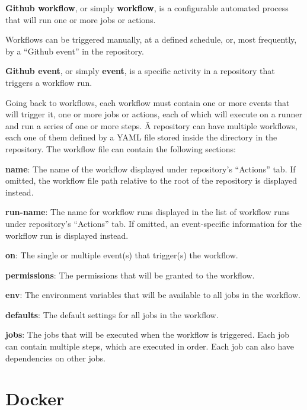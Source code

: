 \textbf{Github workflow}, or simply \textbf{workflow}, is a configurable automated process that will run one or more
jobs or actions.
\ed

Workflows can be triggered manually, at a defined schedule, or, most frequently, by a ``Github event'' in the
repository.

\textbf{Github event}, or simply \textbf{event}, is a specific activity in a repository that triggers a workflow run.
\ed

Going back to workflows, each workflow must contain one or more events that will trigger it, one or more jobs or
actions, each of which will execute on a runner and run a series of one or more steps. \v

A repository can have multiple workflows, each one of them defined by a YAML file stored inside the
 directory in the repository. The workflow file can contain the following sections:

\bit
\item \textbf{name}: The name of the workflow displayed under repository's ``Actions'' tab. If omitted, the workflow
file path relative to the root of the repository is displayed instead.
\item \textbf{run-name}: The name for workflow runs displayed in the list of workflow runs under repository's
``Actions'' tab. If omitted, an event-specific information for the workflow run is displayed instead.
\item \textbf{on}: The single or multiple event(s) that trigger(s) the workflow.
\item \textbf{permissions}: The permissions that will be granted to the workflow.
\item \textbf{env}: The environment variables that will be available to all jobs in the workflow.
\item \textbf{defaults}: The default settings for all jobs in the workflow.
\item \textbf{jobs}: The jobs that will be executed when the workflow is triggered. Each job can contain multiple
steps, which are executed in order. Each job can also have dependencies on other jobs.
\eit

\section{Docker}\label{sec:docker}


